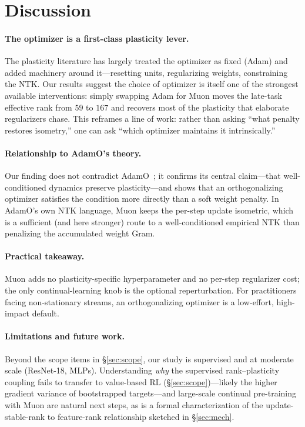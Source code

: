 \documentclass[letterpaper,twocolumn,10pt]{article}
\begin{document}
\section{Discussion}
\paragraph{The optimizer is a first-class plasticity lever.} The plasticity literature has largely treated the optimizer as fixed (Adam) and added machinery around it---resetting units, regularizing weights, constraining the NTK. Our results suggest the choice of optimizer is itself one of the strongest available interventions: simply swapping Adam for Muon moves the late-task effective rank from $59$ to $167$ and recovers most of the plasticity that elaborate regularizers chase. This reframes a line of work: rather than asking ``what penalty restores isometry,'' one can ask ``which optimizer maintains it intrinsically.''
\paragraph{Relationship to AdamO's theory.} Our finding does not contradict AdamO~\citep{adamo2026}; it confirms its central claim---that well-conditioned dynamics preserve plasticity---and shows that an orthogonalizing optimizer satisfies the condition more directly than a soft weight penalty. In AdamO's own NTK language, Muon keeps the per-step update isometric, which is a sufficient (and here stronger) route to a well-conditioned empirical NTK than penalizing the accumulated weight Gram.
\paragraph{Practical takeaway.} Muon adds no plasticity-specific hyperparameter and no per-step regularizer cost; the only continual-learning knob is the optional reperturbation. For practitioners facing non-stationary streams, an orthogonalizing optimizer is a low-effort, high-impact default.
\paragraph{Limitations and future work.} Beyond the scope items in \S\ref{sec:scope}, our study is supervised and at moderate scale (ResNet-18, MLPs). Understanding \emph{why} the supervised rank--plasticity coupling fails to transfer to value-based RL (\S\ref{sec:scope})---likely the higher gradient variance of bootstrapped targets---and large-scale continual pre-training with Muon are natural next steps, as is a formal characterization of the update-stable-rank to feature-rank relationship sketched in \S\ref{sec:mech}.
\end{document}
